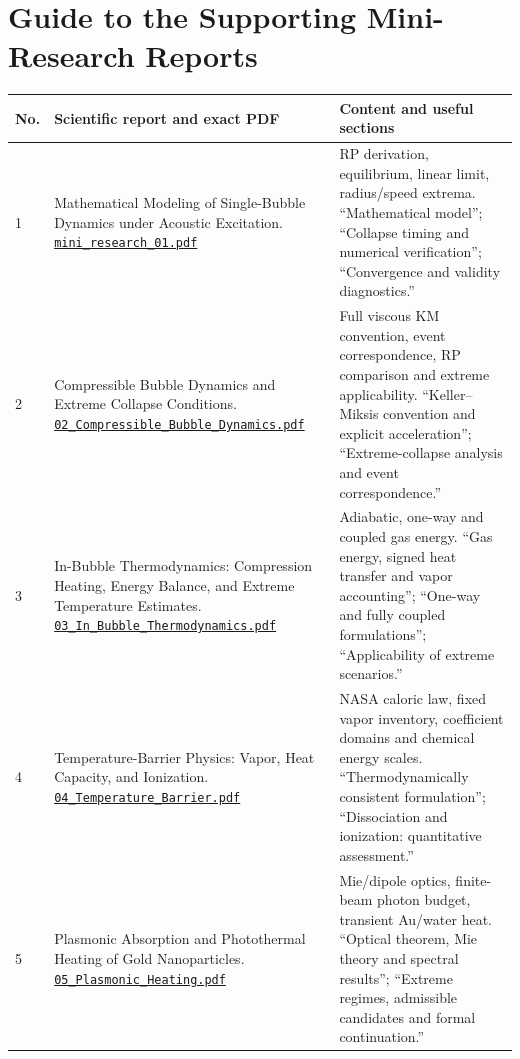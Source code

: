 \documentclass[11pt,a4paper]{article}
\begin{document}
\section*{Guide to the Supporting Mini-Research Reports}
\small
\begin{longtable}{p{.65cm}>{\raggedright\arraybackslash}p{6.9cm}>{\raggedright\arraybackslash}p{6.7cm}}\toprule
No.&Scientific report and exact PDF&Content and useful sections\\\midrule\endhead
1&Mathematical Modeling of Single-Bubble Dynamics under Acoustic Excitation. \href{https://github.com/DimitriBolt/Plasma/blob/main/Mini_Research/01_Bubble_Dynamics/report/mini_research_01.pdf}{\nolinkurl{mini_research_01.pdf}}&RP derivation, equilibrium, linear limit, radius/speed extrema. ``Mathematical model''; ``Collapse timing and numerical verification''; ``Convergence and validity diagnostics.''\\[7pt]
2&Compressible Bubble Dynamics and Extreme Collapse Conditions. \href{https://github.com/DimitriBolt/Plasma/blob/main/Mini_Research/02_Compressible_Bubble_Dynamics/report/02_Compressible_Bubble_Dynamics.pdf}{\nolinkurl{02_Compressible_Bubble_Dynamics.pdf}}&Full viscous KM convention, event correspondence, RP comparison and extreme applicability. ``Keller--Miksis convention and explicit acceleration''; ``Extreme-collapse analysis and event correspondence.''\\[7pt]
3&In-Bubble Thermodynamics: Compression Heating, Energy Balance, and Extreme Temperature Estimates. \href{https://github.com/DimitriBolt/Plasma/blob/main/Mini_Research/03_In_Bubble_Thermodynamics/report/03_In_Bubble_Thermodynamics.pdf}{\nolinkurl{03_In_Bubble_Thermodynamics.pdf}}&Adiabatic, one-way and coupled gas energy. ``Gas energy, signed heat transfer and vapor accounting''; ``One-way and fully coupled formulations''; ``Applicability of extreme scenarios.''\\[7pt]
4&Temperature-Barrier Physics: Vapor, Heat Capacity, and Ionization. \href{https://github.com/DimitriBolt/Plasma/blob/main/Mini_Research/04_Temperature_Barrier/report/04_Temperature_Barrier.pdf}{\nolinkurl{04_Temperature_Barrier.pdf}}&NASA caloric law, fixed vapor inventory, coefficient domains and chemical energy scales. ``Thermodynamically consistent formulation''; ``Dissociation and ionization: quantitative assessment.''\\[7pt]
5&Plasmonic Absorption and Photothermal Heating of Gold Nanoparticles. \href{https://github.com/DimitriBolt/Plasma/blob/main/Mini_Research/05_Plasmonic_Heating/report/05_Plasmonic_Heating.pdf}{\nolinkurl{05_Plasmonic_Heating.pdf}}&Mie/dipole optics, finite-beam photon budget, transient Au/water heat. ``Optical theorem, Mie theory and spectral results''; ``Extreme regimes, admissible candidates and formal continuation.''\\[7pt]

\end{longtable}
\end{document}
